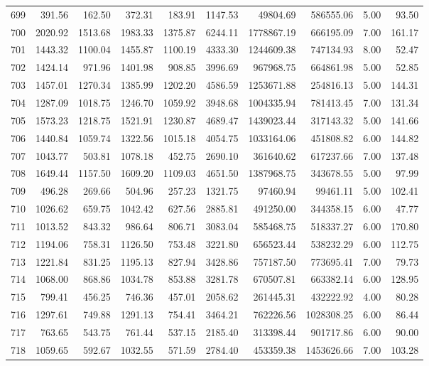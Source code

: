 \begin{tabular}{lrrrrrrrrr}
699 & 391.56 & 162.50 & 372.31 & 183.91 & 1147.53 & 49804.69 & 586555.06 & 5.00 & 93.50 \\
700 & 2020.92 & 1513.68 & 1983.33 & 1375.87 & 6244.11 & 1778867.19 & 666195.09 & 7.00 & 161.17 \\
701 & 1443.32 & 1100.04 & 1455.87 & 1100.19 & 4333.30 & 1244609.38 & 747134.93 & 8.00 & 52.47 \\
702 & 1424.14 & 971.96 & 1401.98 & 908.85 & 3996.69 & 967968.75 & 664861.98 & 5.00 & 52.85 \\
703 & 1457.01 & 1270.34 & 1385.99 & 1202.20 & 4586.59 & 1253671.88 & 254816.13 & 5.00 & 144.31 \\
704 & 1287.09 & 1018.75 & 1246.70 & 1059.92 & 3948.68 & 1004335.94 & 781413.45 & 7.00 & 131.34 \\
705 & 1573.23 & 1218.75 & 1521.91 & 1230.87 & 4689.47 & 1439023.44 & 317143.32 & 5.00 & 141.66 \\
706 & 1440.84 & 1059.74 & 1322.56 & 1015.18 & 4054.75 & 1033164.06 & 451808.82 & 6.00 & 144.82 \\
707 & 1043.77 & 503.81 & 1078.18 & 452.75 & 2690.10 & 361640.62 & 617237.66 & 7.00 & 137.48 \\
708 & 1649.44 & 1157.50 & 1609.20 & 1109.03 & 4651.50 & 1387968.75 & 343678.55 & 5.00 & 97.99 \\
709 & 496.28 & 269.66 & 504.96 & 257.23 & 1321.75 & 97460.94 & 99461.11 & 5.00 & 102.41 \\
710 & 1026.62 & 659.75 & 1042.42 & 627.56 & 2885.81 & 491250.00 & 344358.15 & 6.00 & 47.77 \\
711 & 1013.52 & 843.32 & 986.64 & 806.71 & 3083.04 & 585468.75 & 518337.27 & 6.00 & 170.80 \\
712 & 1194.06 & 758.31 & 1126.50 & 753.48 & 3221.80 & 656523.44 & 538232.29 & 6.00 & 112.75 \\
713 & 1221.84 & 831.25 & 1195.13 & 827.94 & 3428.86 & 757187.50 & 773695.41 & 7.00 & 79.73 \\
714 & 1068.00 & 868.86 & 1034.78 & 853.88 & 3281.78 & 670507.81 & 663382.14 & 6.00 & 128.95 \\
715 & 799.41 & 456.25 & 746.36 & 457.01 & 2058.62 & 261445.31 & 432222.92 & 4.00 & 80.28 \\
716 & 1297.61 & 749.88 & 1291.13 & 754.41 & 3464.21 & 762226.56 & 1028308.25 & 6.00 & 86.44 \\
717 & 763.65 & 543.75 & 761.44 & 537.15 & 2185.40 & 313398.44 & 901717.86 & 6.00 & 90.00 \\
718 & 1059.65 & 592.67 & 1032.55 & 571.59 & 2784.40 & 453359.38 & 1453626.66 & 7.00 & 103.28 \\

\end{tabular}
